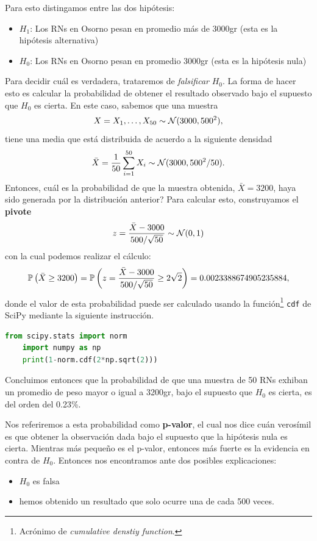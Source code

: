 Para esto distingamos entre las dos hipótesis: 

\begin{itemize}
	\item $H_1$: Los RNs en Osorno pesan en promedio más de 3000gr (esta es la hipótesis alternativa)
	\item $H_0$: Los RNs en Osorno pesan en promedio 3000gr (esta es la hipótesis nula)
\end{itemize}

Para decidir cuál es verdadera, trataremos de \emph{falsificar} $H_0$. La forma de hacer esto es calcular la probabilidad de obtener el resultado observado bajo el supuesto que $H_0$ es cierta. En este caso, sabemos que una muestra 
\begin{equation}
	X = X_1,\ldots,X_{50}\sim{\mathcal N}(3000,500^2),
\end{equation}
tiene una media que está distribuida de acuerdo a la siguiente densidad 
\begin{equation}
	\bar{X} = \frac{1}{50} \sum_{i=1}^{50} X_i \sim {\mathcal N}(3000,500^2/50).
\end{equation}
Entonces, cuál es la probabilidad de que la muestra obtenida, $\bar{X}=3200$, haya sido generada por la distribución anterior? Para calcular esto, construyamos el \textbf{pivote} 
\begin{equation}
	z = \frac{\bar{X}-3000}{500/\sqrt{50}}\sim{\mathcal N}(0,1)
\end{equation}
con la cual podemos realizar el cálculo:
\begin{equation}
	\mathbb{P} \left(\bar{X}\geq 3200\right) = \mathbb{P} \left(z = \frac{\bar{X}-3000}{500/\sqrt{50}}\geq 2\sqrt{2}\right) = 0.0023388674905235884,
\end{equation}
donde el valor de esta probabilidad puede ser calculado usando la función\footnote{Acrónimo de \textit{cumulative denstiy function}.} \texttt{cdf} de SciPy mediante la siguiente instrucción. 
\begin{lstlisting}[language=Python]
	from scipy.stats import norm
	import numpy as np
	print(1-norm.cdf(2*np.sqrt(2)))
\end{lstlisting}
Concluimos entonces que la probabilidad de que una muestra de 50 RNs exhiban un promedio de peso mayor o igual a 3200gr, bajo el supuesto que $H_0$ es cierta, es del orden del 0.23\%. 

Nos referiremos a esta probabilidad como \textbf{p-valor}, el cual nos dice cuán verosímil es que obtener la observación dada bajo el supuesto que la hipótesis nula es cierta. Mientras más pequeño es el p-valor, entonces más fuerte es la evidencia en contra de $H_0$. Entonces nos encontramos ante dos posibles explicaciones: 
\begin{itemize}
 	\item $H_0$ es falsa
 	\item hemos obtenido un resultado que solo ocurre una de cada 500 veces. 
 \end{itemize} 



